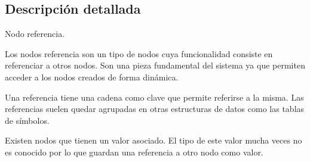 \subsection{Descripción detallada}
Nodo referencia. 

Los nodos referencia son un tipo de nodos cuya funcionalidad consiste en referenciar a otros nodos. Son una pieza fundamental del sistema ya que permiten acceder a los nodos creados de forma dinámica.

Una referencia tiene una cadena como clave que permite referirse a la misma. Las referencias suelen quedar agrupadas en otras estructuras de datos como las tablas de símbolos.

Existen nodos que tienen un valor asociado. El tipo de este valor mucha veces no es conocido por lo que guardan una referencia a otro nodo como valor. 

